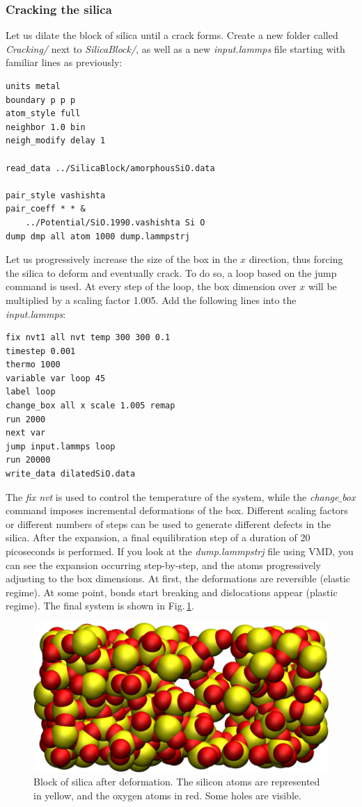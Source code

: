 \documentclass[9pt,tutorial]{livecoms}
\begin{document}
\subsubsection{Cracking the silica}
Let us dilate the block of silica until a crack forms. Create a new folder called \textit{Cracking/} next to \textit{SilicaBlock/}, as well as a new \textit{input.lammps} file starting with familiar lines as previously:
{\normalsize \begin{verbatim}
units metal
boundary p p p
atom_style full
neighbor 1.0 bin
neigh_modify delay 1

read_data ../SilicaBlock/amorphousSiO.data

pair_style vashishta
pair_coeff * * &
    ../Potential/SiO.1990.vashishta Si O
dump dmp all atom 1000 dump.lammpstrj
\end{verbatim}}
Let us progressively increase the size of the box in the $x$ direction, thus forcing the silica to deform and eventually crack. To do so, a loop based on the jump command is used. At every step of the loop, the box dimension over $x$ will be multiplied by a scaling factor 1.005. Add the following lines into the \textit{input.lammps}:
{\normalsize \begin{verbatim}
fix nvt1 all nvt temp 300 300 0.1
timestep 0.001
thermo 1000
variable var loop 45
label loop
change_box all x scale 1.005 remap
run 2000
next var
jump input.lammps loop
run 20000
write_data dilatedSiO.data
\end{verbatim}}
\noindent The \textit{fix nvt} is used to control the temperature of the system, while the \textit{change$\_$box} command
imposes incremental deformations of the box. Different scaling factors or different numbers of steps can be used to generate different defects in the silica. After the expansion, a final equilibration step of a duration of 20 picoseconds is performed. If you look at the \textit{dump.lammpstrj} file using VMD, you can see the expansion occurring step-by-step, and the atoms progressively adjusting to the box dimensions. At first, the deformations are reversible (elastic regime). At some point, bonds start breaking and dislocations appear (plastic regime). The final system is shown in Fig.\,\ref{fig:GCMC-cracked}.

\begin{figure}
\centering
\includegraphics[width=\linewidth]{GCMC-cracked}
\caption{Block of silica after deformation. The silicon atoms are represented in yellow, and the oxygen atoms in red. Some holes are visible.}
\label{fig:GCMC-cracked}
\end{figure}
\end{document}
